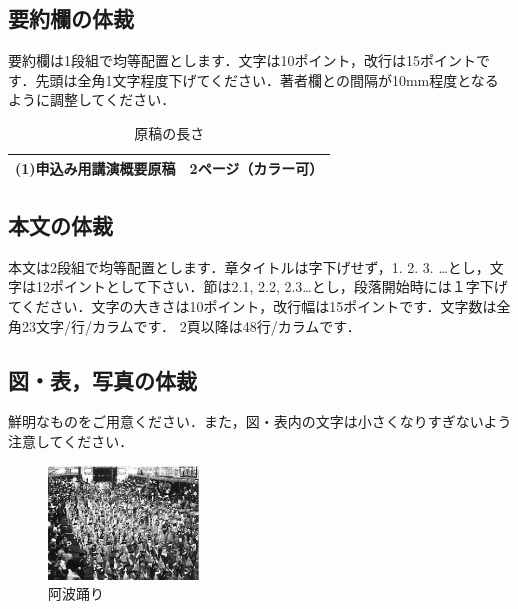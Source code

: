 \documentclass[a4j,twocolumn,10pt]{jarticle}
\begin{document}
\subsection{要約欄の体裁}

要約欄は1段組で均等配置とします．文字は10ポイント，改行は15ポイントです．先頭は全角1文字程度下げてください．著者欄との間隔が10mm程度となるように調整してください．

\renewcommand{\arraystretch}{1.5}
\begin{table}[h]
\caption{原稿の長さ}
\vspace{-5mm} 
\label{tbl}

\begin{center}
\small
\begin{tabular}{p{3.5cm}|p{3.5cm}} \hline
(1)申込み用講演概要原稿 & 2ページ（カラー可） \\ \hline
\end{tabular}
\end{center}
\end{table}


\subsection{本文の体裁}

本文は2段組で均等配置とします．章タイトルは字下げせず，1. 2. 3. …とし，文字は12ポイントとして下さい．節は2.1, 2.2, 2.3…とし，段落開始時には１字下げてください．文字の大きさは10ポイント，改行幅は15ポイントです．文字数は全角23文字/行/カラムです． 2頁以降は48行/カラムです．

\subsection{図・表，写真の体裁}

鮮明なものをご用意ください．また，図・表内の文字は小さくなりすぎないよう注意してください．

\renewcommand{\arraystretch}{1.0}
\begin{figure}[h]
\centering
\includegraphics[width=40mm]{awaodori.eps}
\caption{阿波踊り}
\label{fig:graph3}
\end{figure}
\end{document}
